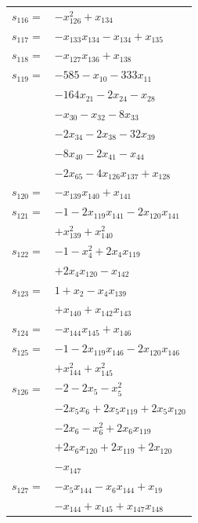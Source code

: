 \begin{longtable}{@{}r@{\;}l@{}}
\(s_{116}=\) & \(\displaystyle -x_{126}^{2} +x_{134}\) \\[3pt]
\(s_{117}=\) & \(\displaystyle -x_{133}x_{134} -x_{134} +x_{135}\) \\[3pt]
\(s_{118}=\) & \(\displaystyle -x_{127}x_{136} +x_{138}\) \\[3pt]
\(s_{119}=\) & \(\displaystyle -585 -x_{10} -333x_{11}\) \\
 & \(\displaystyle -164x_{21} -2x_{24} -x_{28}\) \\
 & \(\displaystyle -x_{30} -x_{32} -8x_{33}\) \\
 & \(\displaystyle -2x_{34} -2x_{38} -32x_{39}\) \\
 & \(\displaystyle -8x_{40} -2x_{41} -x_{44}\) \\
 & \(\displaystyle -2x_{65} -4x_{126}x_{137} +x_{128}\) \\[3pt]
\(s_{120}=\) & \(\displaystyle -x_{139}x_{140} +x_{141}\) \\[3pt]
\(s_{121}=\) & \(\displaystyle -1 -2x_{119}x_{141} -2x_{120}x_{141}\) \\
 & \(\displaystyle +x_{139}^{2} +x_{140}^{2}\) \\[3pt]
\(s_{122}=\) & \(\displaystyle -1 -x_{4}^{2} +2x_{4}x_{119}\) \\
 & \(\displaystyle +2x_{4}x_{120} -x_{142}\) \\[3pt]
\(s_{123}=\) & \(\displaystyle 1 +x_{2} -x_{4}x_{139}\) \\
 & \(\displaystyle +x_{140} +x_{142}x_{143}\) \\[3pt]
\(s_{124}=\) & \(\displaystyle -x_{144}x_{145} +x_{146}\) \\[3pt]
\(s_{125}=\) & \(\displaystyle -1 -2x_{119}x_{146} -2x_{120}x_{146}\) \\
 & \(\displaystyle +x_{144}^{2} +x_{145}^{2}\) \\[3pt]
\(s_{126}=\) & \(\displaystyle -2 -2x_{5} -x_{5}^{2}\) \\
 & \(\displaystyle -2x_{5}x_{6} +2x_{5}x_{119} +2x_{5}x_{120}\) \\
 & \(\displaystyle -2x_{6} -x_{6}^{2} +2x_{6}x_{119}\) \\
 & \(\displaystyle +2x_{6}x_{120} +2x_{119} +2x_{120}\) \\
 & \(\displaystyle -x_{147}\) \\[3pt]
\(s_{127}=\) & \(\displaystyle -x_{5}x_{144} -x_{6}x_{144} +x_{19}\) \\
 & \(\displaystyle -x_{144} +x_{145} +x_{147}x_{148}\) \\[3pt]

\end{longtable}
